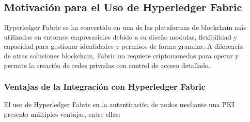 \subsection{Motivación para el Uso de Hyperledger Fabric}

Hyperledger Fabric\cite{hyperledgerfabric} se ha convertido en una de las plataformas de blockchain más utilizadas en entornos empresariales debido a su diseño modular, flexibilidad y capacidad para gestionar identidades y permisos de forma granular. A diferencia de otras soluciones blockchain, Fabric no requiere criptomonedas para operar y permite la creación de redes privadas con control de acceso detallado.

\subsubsection{Ventajas de la Integración con Hyperledger Fabric}

El uso de Hyperledger Fabric en la autenticación de nodos mediante una PKI presenta múltiples ventajas, entre ellas:

